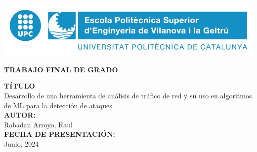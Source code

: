 \begin{titlepage}
    \begin{center}
        \includegraphics{media/epsevg_logo.jpeg}

        \vspace{1.5cm}
        {\Huge\textbf{TRABAJO FINAL DE GRADO}}

        \vfill
        \textbf{TÍTULO} \\  	Desarrollo de una herramienta de análisis de tráfico de red y su uso en algoritmos de ML para la detección de ataques.
        \\[\baselineskip]
        \textbf{AUTOR:} \\ Rabadan Arroyo, Raul 
        \\[\baselineskip]
        \textbf{FECHA DE PRESENTACIÓN:} \\ Junio, 2024
        \vfill

    \end{center}
\end{titlepage}

